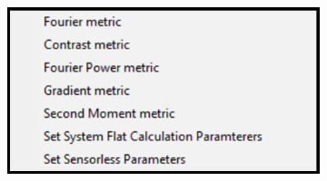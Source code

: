 \begin{figure}[H]
\begin{subfigure}{0.25\textwidth}
		\caption{}
		\label{fig:DM_methods_cockpit}
	\end{subfigure}
	\begin{subfigure}{0.5\textwidth}
		\centering
		\includegraphics[width=\linewidth]{images/DM_methods_cockpit_options.png}
		\caption{}
		\label{fig:DM_methods_cockpit_options}
	\end{subfigure}
	

\end{figure}
